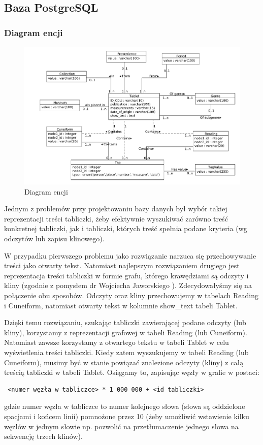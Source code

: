 \subsection{Baza PostgreSQL}
\subsubsection{Diagram encji}
\begin{figure}[h]
 \centering
 \includegraphics[width=500px]{../diagramy/diagram-encji-maly.pdf}
 \caption{Diagram encji}
\end{figure}
Jednym z problemów przy projektowaniu bazy danych był wybór takiej reprezentacji treści tabliczki, 
żeby efektywnie wyszukiwać zarówno treść konkretnej tabliczki, jak i tabliczki, których treść spełnia podane kryteria
 (wg odczytów lub zapisu klinowego).

W przypadku pierwszego problemu jako rozwiązanie narzuca się przechowywanie treści
jako otwarty tekst.
Natomiast najlepszym rozwiązaniem drugiego jest reprezentacja treści tabliczki
w formie grafu, którego krawędziami są odczyty i kliny (zgodnie z pomysłem dr Wojciecha Jaworskiego \cite[s.374]{jaworski}).
Zdecydowałyśmy się na połączenie obu sposobów. Odczyty oraz kliny przechowujemy w tabelach Reading i Cuneiform, 
natomiast otwarty tekst w kolumnie show\_text tabeli Tablet. 

Dzięki temu rozwiązaniu, szukając tabliczki zawierającej podane odczyty (lub kliny), korzystamy z reprezentacji
grafowej w tabeli Reading (lub Cuneiform).
Natomiast zawsze korzystamy z otwartego tekstu w tabeli Tablet w celu wyświetlenia treści tabliczki.
Kiedy zatem wyszukujemy w tabeli Reading (lub Cuneiform), musimy być w stanie powiązać znalezione odczyty (kliny) 
z całą treścią tabliczki w tabeli Tablet. Osiągamy to, zapisując węzły w grafie w postaci:
\begin{verbatim}
 <numer węzła w tabliczce> * 1 000 000 + <id tabliczki>
\end{verbatim}
gdzie numer węzła w tabliczce to numer kolejnego słowa (słowa są oddzielone spacjami i końcem linii) pomnożone przez 10 
(żeby umożliwić wstawienie kilku węzłów w jednym słowie np. pozwolić na przetłumaczenie jednego słowa na sekwencję trzech klinów). 


